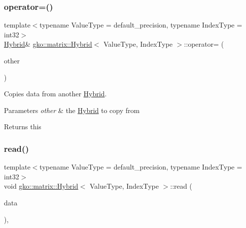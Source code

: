 \subsubsection{\texorpdfstring{operator=()}{operator=()}}
{\footnotesize\ttfamily template$<$typename Value\+Type = default\+\_\+precision, typename Index\+Type = int32$>$ \\
\hyperlink{classgko_1_1matrix_1_1Hybrid}{Hybrid}\& \hyperlink{classgko_1_1matrix_1_1Hybrid}{gko\+::matrix\+::\+Hybrid}$<$ Value\+Type, Index\+Type $>$\+::operator= (\begin{DoxyParamCaption}\item[{const \hyperlink{classgko_1_1matrix_1_1Hybrid}{Hybrid}$<$ Value\+Type, Index\+Type $>$ \&}]{other }\end{DoxyParamCaption})}



Copies data from another \hyperlink{classgko_1_1matrix_1_1Hybrid}{Hybrid}. 


\begin{DoxyParams}{Parameters}
{\em other} & the \hyperlink{classgko_1_1matrix_1_1Hybrid}{Hybrid} to copy from\\
\hline
\end{DoxyParams}
\begin{DoxyReturn}{Returns}
this 
\end{DoxyReturn}
\mbox{\label{classgko_1_1matrix_1_1Hybrid_a7eff2922ae21e9722b343ca1832d8bf5}} 
\subsubsection{\texorpdfstring{read()}{read()}}
{\footnotesize\ttfamily template$<$typename Value\+Type = default\+\_\+precision, typename Index\+Type = int32$>$ \\
void \hyperlink{classgko_1_1matrix_1_1Hybrid}{gko\+::matrix\+::\+Hybrid}$<$ Value\+Type, Index\+Type $>$\+::read (\begin{DoxyParamCaption}\item[{const \hyperlink{structgko_1_1matrix__data}{mat\+\_\+data} \&}]{data }\end{DoxyParamCaption})\hspace{0.3cm}{\ttfamily [override]}, {\ttfamily [virtual]}}



